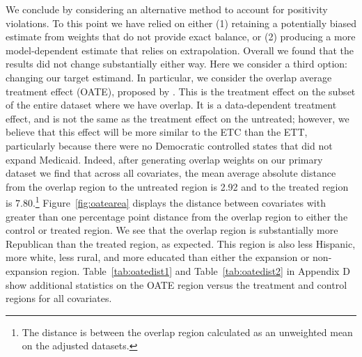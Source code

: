 \documentclass{article}
\begin{document}
We conclude by considering an alternative method to account for positivity violations. To this point we have relied on either (1) retaining a potentially biased estimate from weights that do not provide exact balance, or (2) producing a more model-dependent estimate that relies on extrapolation. Overall we found that the results did not change substantially either way. Here we consider a third option: changing our target estimand. In particular, we consider the overlap average treatment effect (OATE), proposed by \cite{li2018balancing}. This is the treatment effect on the subset of the entire dataset where we have overlap. It is a data-dependent treatment effect, and is not the same as the treatment effect on the untreated; however, we believe that this effect will be more similar to the ETC than the ETT, particularly because there were no Democratic controlled states that did not expand Medicaid. Indeed, after generating overlap weights on our primary dataset we find that across all covariates, the mean average absolute distance from the overlap region to the untreated region is 2.92 and to the treated region is 7.80.\footnote{The distance is between the overlap region calculated as an unweighted mean on the adjusted datasets.} Figure~\ref{fig:oatearea} displays the distance between covariates with greater than one percentage point distance from the overlap region to either the control or treated region. We see that the overlap region is substantially more Republican than the treated region, as expected. This region is also less Hispanic, more white, less rural, and more educated than either the expansion or non-expansion region. Table~\ref{tab:oatedist1} and Table~\ref{tab:oatedist2} in Appendix D show additional statistics on the OATE region versus the treatment and control regions for all covariates.
\end{document}
